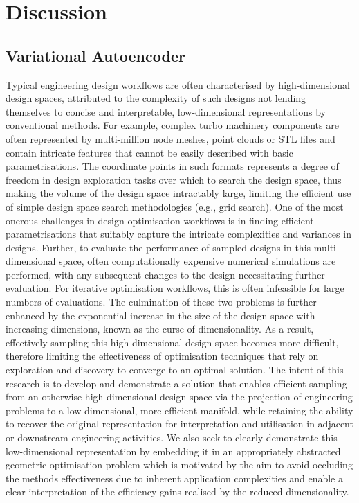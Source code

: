 \documentclass{article}
\begin{document}
\newpage{}

\section{Discussion}
\subsection{Variational Autoencoder}
Typical engineering design workflows are often characterised by high-dimensional design spaces, attributed to the complexity of such designs not lending themselves to concise and interpretable, low-dimensional representations by conventional methods. For example, complex turbo machinery components are often represented by multi-million node meshes, point clouds or STL files and contain intricate features that cannot be easily described with basic parametrisations. The coordinate points in such formats represents a degree of freedom in design exploration tasks over which to search the design space, thus making the volume of the design space intractably large, limiting the efficient use of simple design space search methodologies (e.g., grid search). One of the most onerous challenges in design optimisation workflows is in finding efficient parametrisations that suitably capture the intricate complexities and variances in designs. Further, to evaluate the performance of sampled designs in this multi-dimensional space, often computationally expensive numerical simulations are performed, with any subsequent changes to the design necessitating further evaluation. For iterative optimisation workflows, this is often infeasible for large numbers of evaluations. The culmination of these two problems is further enhanced by the exponential increase in the size of the design space with increasing dimensions, known as the curse of dimensionality. As a result, effectively sampling this high-dimensional design space becomes more difficult, therefore limiting the effectiveness of optimisation techniques that rely on exploration and discovery to converge to an optimal solution.
The intent of this research is to develop and demonstrate a solution that enables efficient sampling from an otherwise high-dimensional design space via the projection of engineering problems to a low-dimensional, more efficient manifold, while retaining the ability to recover the original representation for interpretation and utilisation in adjacent or downstream engineering activities. We also seek to clearly demonstrate this low-dimensional representation by embedding it in an appropriately abstracted geometric optimisation problem which is motivated by the aim to avoid occluding the methods effectiveness due to inherent application complexities and enable a clear interpretation of the efficiency gains realised by the reduced dimensionality.
\end{document}
